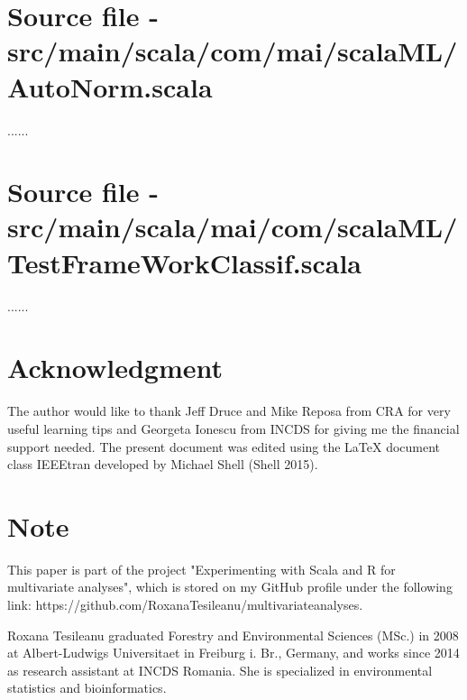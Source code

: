 \documentclass[journal]{IEEEtran}
\begin{document}
\section{Source file - src/main/scala/com/mai/scalaML/AutoNorm.scala}

......

\section{Source file - src/main/scala/mai/com/scalaML/TestFrameWorkClassif.scala}

......

 

\section*{Acknowledgment}
The author would like to thank Jeff Druce and Mike Reposa from CRA for very useful learning tips and Georgeta Ionescu from INCDS for giving me the financial support needed. The present document was edited using the LaTeX document class IEEEtran developed by Michael Shell (Shell 2015).  

\section*{Note}
This paper is part of the project "Experimenting with Scala and R for multivariate analyses", which  is stored on my GitHub profile under the following link: https://github.com/RoxanaTesileanu/multivariate\underline{\space}analyses.  


\begin {IEEEbiographynophoto}{Roxana Tesileanu}
graduated Forestry and Environmental Sciences (MSc.) in 2008 at Albert-Ludwigs Universitaet in Freiburg i. Br., Germany, and works since 2014 as research assistant at INCDS Romania. She is specialized in environmental statistics and bioinformatics. 
\end{IEEEbiographynophoto}
\end{document}
